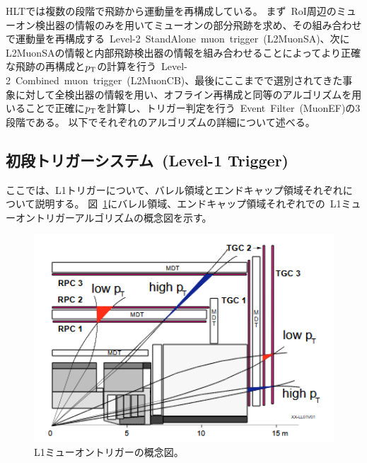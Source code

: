 HLTでは複数の段階で飛跡から運動量を再構成している。
まず~RoI周辺のミューオン検出器の情報のみを用いてミューオンの部分飛跡を求め、その組み合わせで運動量を再構成する~Level-2~StandAlone~muon~trigger~(L2MuonSA)、次にL2MuonSAの情報と内部飛跡検出器の情報を組み合わせることによってより正確な飛跡の再構成と$p_\mathrm{T}$の計算を行う~Level-2~Combined~muon~trigger~(L2MuonCB)、最後にここまでで選別されてきた事象に対して全検出器の情報を用い、オフライン再構成と同等のアルゴリズムを用いることで正確に$p_\mathrm{T}$を計算し、トリガー判定を行う~Event~Filter~(MuonEF)の3段階である。
以下でそれぞれのアルゴリズムの詳細について述べる。

\subsection{初段トリガーシステム~(Level-1 Trigger)}\label{chapter3-2-1}
ここでは、L1トリガーについて、バレル領域とエンドキャップ領域それぞれについて説明する。
図~\ref{fig:3-2}にバレル領域、エンドキャップ領域それぞれでの~L1ミューオントリガーアルゴリズムの概念図を示す。

\begin{figure}[h]
  \centering
  \includegraphics[clip, width=13cm]{fig/3/muon_trigger_overview.png}
  \caption{L1ミューオントリガーの概念図\cite{article:barrelSystem}。}
  \label{fig:3-2}
\end{figure}

